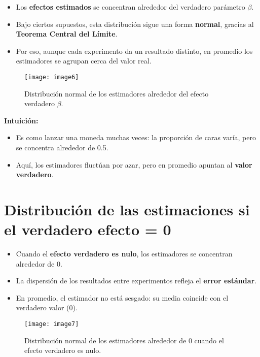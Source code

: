 \documentclass[12pt]{article}
\begin{document}
\begin{itemize}
    \item Los \textbf{efectos estimados} se concentran alrededor del verdadero parámetro $\beta$.
    \item Bajo ciertos supuestos, esta distribución sigue una forma \textbf{normal}, gracias al \textbf{Teorema Central del Límite}.
    \item Por eso, aunque cada experimento da un resultado distinto, en promedio los estimadores se agrupan cerca del valor real.
\end{itemize}

\begin{figure}[H]
\centering
\texttt{[image: image6]}
\caption{\footnotesize Distribución normal de los estimadores alrededor del efecto verdadero $\beta$.}
\end{figure}

\textbf{Intuición:}
\begin{itemize}
    \item Es como lanzar una moneda muchas veces: la proporción de caras varía, pero se concentra alrededor de 0.5.
    \item Aquí, los estimadores fluctúan por azar, pero en promedio apuntan al \textbf{valor verdadero}.
\end{itemize}

\section*{\noindent\textbf{Distribución de las estimaciones si el verdadero efecto = 0}}

\begin{itemize}
    \item Cuando el \textbf{efecto verdadero es nulo}, los estimadores se concentran alrededor de 0.
    \item La dispersión de los resultados entre experimentos refleja el \textbf{error estándar}.
    \item En promedio, el estimador no está sesgado: su media coincide con el verdadero valor (0).
\end{itemize}

\begin{figure}[H]
\centering
\texttt{[image: image7]}
\caption{\footnotesize Distribución normal de los estimadores alrededor de $0$ cuando el efecto verdadero es nulo.}
\end{figure}
\end{document}
